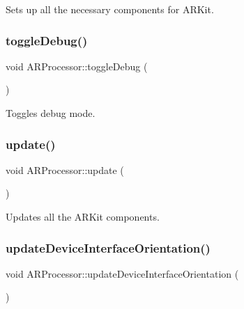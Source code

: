 Sets up all the necessary components for A\+R\+Kit. 

\mbox{\label{class_a_r_processor_a832585774cbeb04cc181f01c193940b5}} 
\subsubsection{\texorpdfstring{toggle\+Debug()}{toggleDebug()}}
{\footnotesize\ttfamily void A\+R\+Processor\+::toggle\+Debug (\begin{DoxyParamCaption}{ }\end{DoxyParamCaption})}



Toggles debug mode. 

\mbox{\label{class_a_r_processor_a76b6cbb62dcc0aa87e38e48cc8dbe621}} 
\subsubsection{\texorpdfstring{update()}{update()}}
{\footnotesize\ttfamily void A\+R\+Processor\+::update (\begin{DoxyParamCaption}{ }\end{DoxyParamCaption})}



Updates all the A\+R\+Kit components. 

\mbox{\label{class_a_r_processor_a48797c1a249b2f115d0151396bc1eb9c}} 
\subsubsection{\texorpdfstring{update\+Device\+Interface\+Orientation()}{updateDeviceInterfaceOrientation()}}
{\footnotesize\ttfamily void A\+R\+Processor\+::update\+Device\+Interface\+Orientation (\begin{DoxyParamCaption}{ }\end{DoxyParamCaption})}

